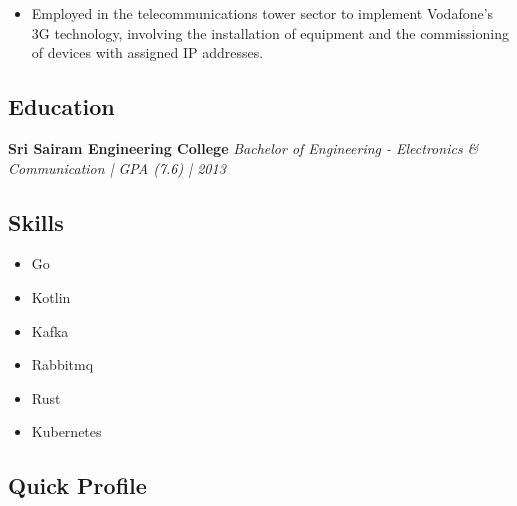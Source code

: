\documentclass[11pt, oneside]{article}
\begin{document}
\begin{itemize}
  \item Employed in the telecommunications tower sector to implement Vodafone's 3G technology, involving the installation of equipment and the commissioning of devices with assigned IP addresses.

\end{itemize}

\medskip
\subsection*{Education}
\textbf{Sri Sairam Engineering College}
\hfill
\textit{Bachelor of Engineering - Electronics \& Communication | GPA (7.6) | 2013}

\medskip
\subsection*{Skills}
\begin{multicols}{3}
  \begin{itemize}
    \item Go
    \item Kotlin
    \item Kafka
    \item Rabbitmq
    \item Rust
    \item Kubernetes
  \end{itemize}
\end{multicols}

\medskip
\subsection*{Quick Profile}
\begin{figure}[h!]
\centering
{}
\end{figure}
\end{document}
